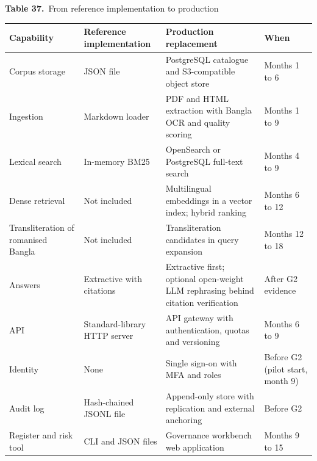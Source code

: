 \documentclass[border=10pt]{standalone}
\begin{document}
\begin{minipage}{17cm}
{\large\bfseries Table 37.}\ {\large From reference implementation to production}\par\vspace{7pt}
\small
{}
\begin{tabularx}{\linewidth}{@{}>{\hsize=0.916\hsize\raggedright\arraybackslash}X>{\hsize=1.060\hsize\raggedright\arraybackslash}X>{\hsize=1.398\hsize\raggedright\arraybackslash}X>{\hsize=0.627\hsize\raggedright\arraybackslash}X@{}}
\arrayrulecolor{bapilrule}\toprule
\rowcolor{white}\textbf{Capability} & \textbf{Reference implementation} & \textbf{Production replacement} & \textbf{When} \\
\midrule
Corpus storage & JSON file & PostgreSQL catalogue and S3-compatible object store & Months 1 to 6 \\
Ingestion & Markdown loader & PDF and HTML extraction with Bangla OCR and quality scoring & Months 1 to 9 \\
Lexical search & In-memory BM25 & OpenSearch or PostgreSQL full-text search & Months 4 to 9 \\
Dense retrieval & Not included & Multilingual embeddings in a vector index; hybrid ranking & Months 6 to 12 \\
Transliteration of romanised Bangla & Not included & Transliteration candidates in query expansion & Months 12 to 18 \\
Answers & Extractive with citations & Extractive first; optional open-weight LLM rephrasing behind citation verification & After G2 evidence \\
API & Standard-library HTTP server & API gateway with authentication, quotas and versioning & Months 6 to 9 \\
Identity & None & Single sign-on with MFA and roles & Before G2 (pilot start, month 9) \\
Audit log & Hash-chained JSONL file & Append-only store with replication and external anchoring & Before G2 \\
Register and risk tool & CLI and JSON files & Governance workbench web application & Months 9 to 15 \\
\bottomrule
\end{tabularx}
\par{}
\end{minipage}
\end{document}
